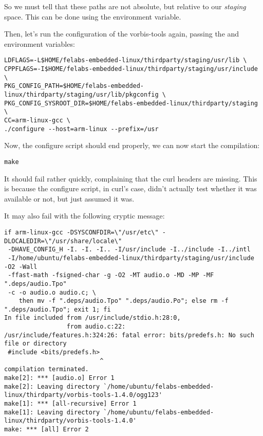 So we must tell  that these paths are not absolute,
but relative to our {\em staging} space. This can be done using the
 environment variable.

Then, let's run the configuration of the vorbis-tools again, passing
the  and 
environment variables:

\small
\begin{verbatim}
LDFLAGS=-L$HOME/felabs-embedded-linux/thirdparty/staging/usr/lib \
CPPFLAGS=-I$HOME/felabs-embedded-linux/thirdparty/staging/usr/include \
PKG_CONFIG_PATH=$HOME/felabs-embedded-linux/thirdparty/staging/usr/lib/pkgconfig \
PKG_CONFIG_SYSROOT_DIR=$HOME/felabs-embedded-linux/thirdparty/staging \
CC=arm-linux-gcc \
./configure --host=arm-linux --prefix=/usr
\end{verbatim}
\normalsize

Now, the configure script should end properly, we can now start the
compilation:
\begin{verbatim}
make
\end{verbatim}

It should fail rather quickly, complaining that the curl headers are
missing. This is because the configure script, in curl's case, didn't
actually test whether it was available or not, but just assumed it was.

It may also fail with the following cryptic message:
\footnotesize
\begin{verbatim}
if arm-linux-gcc -DSYSCONFDIR=\"/usr/etc\" -DLOCALEDIR=\"/usr/share/locale\"
 -DHAVE_CONFIG_H -I. -I. -I.. -I/usr/include -I../include -I../intl
 -I/home/ubuntu/felabs-embedded-linux/thirdparty/staging/usr/include  -O2 -Wall
 -ffast-math -fsigned-char -g -O2 -MT audio.o -MD -MP -MF ".deps/audio.Tpo"
 -c -o audio.o audio.c; \
	then mv -f ".deps/audio.Tpo" ".deps/audio.Po"; else rm -f ".deps/audio.Tpo"; exit 1; fi
In file included from /usr/include/stdio.h:28:0,
                 from audio.c:22:
/usr/include/features.h:324:26: fatal error: bits/predefs.h: No such file or directory
 #include <bits/predefs.h>
                          ^
compilation terminated.
make[2]: *** [audio.o] Error 1
make[2]: Leaving directory `/home/ubuntu/felabs-embedded-linux/thirdparty/vorbis-tools-1.4.0/ogg123'
make[1]: *** [all-recursive] Error 1
make[1]: Leaving directory `/home/ubuntu/felabs-embedded-linux/thirdparty/vorbis-tools-1.4.0'
make: *** [all] Error 2
\end{verbatim}
\normalsize

